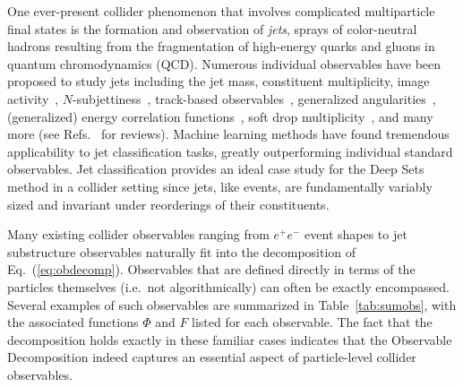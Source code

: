 \documentclass[letterpaper,11pt]{article}
\DeclareRobustCommand{\Tab}[1]{Table~\ref{#1}}
\DeclareRobustCommand{\Eq}[1]{Eq.~(\ref{#1})}
\DeclareRobustCommand{\Refs}[1]{Refs.~\cite{#1}}
\begin{document}
One ever-present collider phenomenon that involves complicated multiparticle final states is the formation and observation of \emph{jets}, sprays of color-neutral hadrons resulting from the fragmentation of high-energy quarks and gluons in quantum chromodynamics (QCD).
%
Numerous individual observables have been proposed to study jets including the jet mass, constituent multiplicity, image activity~\cite{Pumplin:1991kc}, $N$-subjettiness~\cite{Thaler:2010tr,Thaler:2011gf}, track-based observables~\cite{Krohn:2012fg,Chang:2013rca}, generalized angularities~\cite{Larkoski:2014pca}, (generalized) energy correlation functions~\cite{Larkoski:2013eya,Moult:2016cvt}, soft drop multiplicity~\cite{Larkoski:2014wba,Frye:2017yrw}, and many more (see \Refs{Abdesselam:2010pt,Altheimer:2012mn,Altheimer:2013yza,Adams:2015hiv,Larkoski:2017jix,Asquith:2018igt} for reviews).
%
Machine learning methods have found tremendous applicability to jet classification tasks, greatly outperforming individual standard observables.
%
Jet classification provides an ideal case study for the Deep Sets method in a collider setting since jets, like events, are fundamentally variably sized and invariant under reorderings of their constituents.


Many existing collider observables ranging from $e^+e^-$ event shapes to jet substructure observables naturally fit into the decomposition of \Eq{eq:obdecomp}.
%
Observables that are defined directly in terms of the particles themselves (i.e.\ not algorithmically) can often be exactly encompassed.
%
Several examples of such observables are summarized in \Tab{tab:sumobs}, with the associated functions $\Phi$ and $F$ listed for each observable.
%
The fact that the decomposition holds exactly in these familiar cases indicates that the Observable Decomposition indeed captures an essential aspect of particle-level collider observables.
\end{document}
